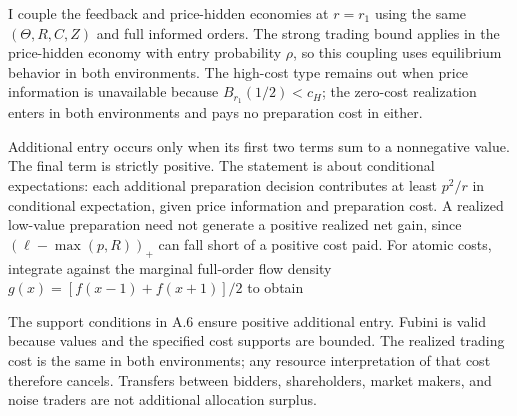 
I couple the feedback and price-hidden economies at \(r=r_1\) using the
same \((\Theta,R,C,Z)\) and full informed orders. The strong trading
bound applies in the price-hidden economy with entry probability
\(\rho\), so this coupling uses equilibrium behavior in both
environments. The high-cost type remains out when price information is
unavailable because \(B_{r_1}(1/2)<c_H\); the zero-cost realization
enters in both environments and pays no preparation cost in either.

Additional entry occurs only when its first two terms sum to a
nonnegative value. The final term is strictly positive. The statement is
about conditional expectations: each additional preparation decision
contributes at least \(p^2/r\) in conditional expectation, given price
information and preparation cost. A realized low-value preparation need
not generate a positive realized net gain, since \((\ell-\max(p,R))_+\)
can fall short of a positive cost paid. For atomic costs, integrate against the
marginal full-order flow density \(g(x)=[f(x-1)+f(x+1)]/2\) to obtain

The support conditions in A.6 ensure positive additional entry. Fubini
is valid because values and the specified cost supports are bounded. The
realized trading cost is the same in both environments; any resource
interpretation of that cost therefore cancels. Transfers between
bidders, shareholders, market makers, and noise traders are not
additional allocation surplus.
